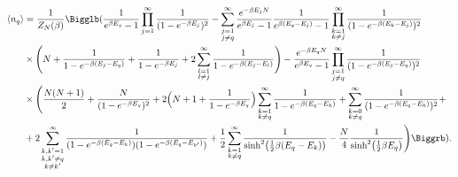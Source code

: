\documentclass[aps,pra,reprint]{revtex4-2}
\begin{document}
\begin{equation}
\begin{split}
\langle n_q \rangle &= \frac{1}{Z_N(\beta)} \Bigglb (\frac{1}{e^{\beta E_q}-1} 
\prod_{j=1}^{\infty} \frac{1}{(1-e^{-\beta E_j})^2} - 
\sum_{\substack{j=1 \\ j \neq q}}^{\infty} 
\frac{e^{-\beta E_j N}}{e^{\beta E_j}-1} \frac{1}{e^{\beta (E_q-E_j)}-1} 
\prod_{\substack{k=1 \\ k \neq j}}^{\infty} 
\frac{1}{(1-e^{-\beta (E_k-E_j)})^2} \\ 
& \times \Bigg(N + \frac{1}{1-e^{-\beta (E_j-E_q)}} + 
\frac{1}{1-e^{-\beta E_j}} + 2\sum_{\substack{l=1 \\ l \neq j}}^{\infty} 
\frac{1}{1-e^{-\beta (E_j-E_l)}} \Bigg) - 
\frac{e^{-\beta E_q N}}{e^{\beta E_q}-1} 
\prod_{\substack{j=1 \\ j \neq q}}^{\infty} 
\frac{1}{(1-e^{-\beta (E_j-E_q)})^2} \\ 
& \times \Bigg(\frac{N (N+1)}{2} + \frac{N}{(1-e^{-\beta E_q})^2} + 
2\Big(N + 1 + \frac{1}{1-e^{-\beta E_q}} \Big) 
\sum_{\substack{k=1 \\ k \neq q}}^{\infty} \frac{1}{1-e^{-\beta (E_q-E_k)}} + 
\sum_{\substack{k=0 \\ k \neq q}}^{\infty} \frac{1}{(1-e^{-\beta (E_q-E_k)})^2} 
+ \\ 
& + 2\sum _{\substack{k,k'=1 \\ k,k' \neq q \\ k \neq k'}}^{\infty} 
\frac{1}{(1-e^{-\beta (E_q-E_k)}) (1-e^{-\beta (E_q-E_{k'})})} + \frac{1}{2} 
\sum_{\substack{k=1 \\ k \neq q}}^{\infty} 
\frac{1}{\text{sinh}^2 \big(\frac{1}{2} \beta (E_q-E_k) \big)} - 
\frac{N}{4} \frac{1}{\text{sinh}^2 \big(\frac{1}{2} \beta E_q \big)} 
\Bigg) \Biggrb ).
\end{split}
\end{equation}
\end{document}
